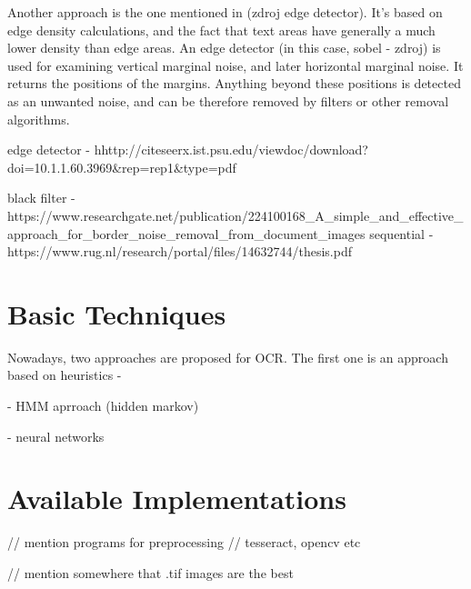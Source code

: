 Another approach is the one mentioned in (zdroj edge detector). It's based on edge density calculations, and the fact that text areas have generally a much lower density than edge areas. An edge detector (in this case, sobel - zdroj) is used for examining vertical marginal noise, and later horizontal marginal noise. It returns the positions of the margins. Anything beyond these positions is detected as an unwanted noise, and can be therefore removed by filters or other removal algorithms.

edge detector - hhttp://citeseerx.ist.psu.edu/viewdoc/download?doi=10.1.1.60.3969&rep=rep1&type=pdf

black filter -  https://www.researchgate.net/publication/224100168_A_simple_and_effective_approach_for_border_noise_removal_from_document_images
sequential - https://www.rug.nl/research/portal/files/14632744/thesis.pdf

\section{Basic Techniques}

Nowadays, two approaches are proposed for OCR. The first one is an approach based on heuristics - 


- HMM aprroach (hidden markov)

- neural networks

\section{Available Implementations}
// mention programs for preprocessing
// tesseract, opencv etc

// mention somewhere that .tif images are the best